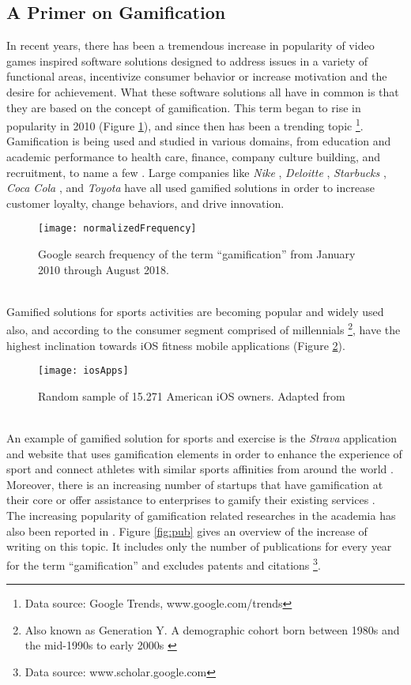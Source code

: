 \subsection{A Primer on Gamification}
In recent years, there has been a tremendous increase in popularity of video games inspired software solutions designed to address issues in a variety of functional areas, incentivize consumer behavior or increase motivation and the desire for achievement. What these software solutions all have in common is that they are based on the concept of gamification. This term began to rise in popularity in 2010 (Figure \ref{fig:buzz}), and since then has been a trending topic \footnote{Data source: Google Trends, www.google.com/trends}. Gamification is being used and studied in various domains, from education and academic performance to health care, finance, company culture building, and recruitment, to name a few \cite{gamificationExamples, gamificationWiki, enterpriseGamify}. Large companies like \textit{Nike} \cite{nikePlus}, \textit{Deloitte} \cite{deloitte}, \textit{Starbucks} \cite{starbucks}, \textit{Coca Cola} \cite{coke}, and \textit{Toyota} \cite{toyota} have all used gamified solutions in order to increase customer loyalty, change behaviors, and drive innovation. \pagebreak 
\begin{figure}[h]
    \centering
    \texttt{[image: normalizedFrequency]}
    \caption[Search frequency on ``gamification'' ]{Google search frequency of the term ``gamification'' from January 2010 through August 2018.}
    \label{fig:buzz}
\end{figure}\\
Gamified solutions for sports activities are becoming popular and widely used also, and according to \cite{iosPopulatity} the consumer segment comprised of millennials \footnote{Also known as Generation Y. A demographic cohort born between 1980s and the mid-1990s to early 2000s \cite{mill}}, have the highest inclination towards iOS fitness mobile applications (Figure \ref{fig:iosApps}). 
\begin{figure}[h]
    \centering
    \texttt{[image: iosApps]}
    \caption{Random sample of 15.271 American iOS owners. Adapted from \cite{iosPopulatity}}
    \label{fig:iosApps}
\end{figure}\\
An example of gamified solution for sports and exercise is the \textit{Strava} application and website that uses gamification elements in order to enhance the experience of sport and connect athletes with similar sports affinities from around the world \cite{strava}. Moreover, there is an increasing number of startups \cite{foursquare, codeacademy} that have gamification at their core or offer assistance to enterprises to gamify their existing services \cite{badgeville}. \\The increasing popularity of gamification related researches in the academia has also been reported in \cite{hamari2014does}. Figure \ref{fig:pub} gives an overview of the increase of writing on this topic. It includes only the number of publications for every year for the term ``gamification'' and excludes patents and citations \footnote{Data source: www.scholar.google.com}. 
